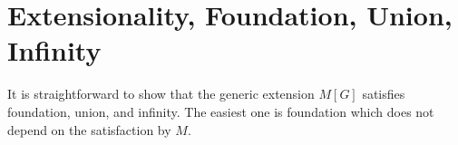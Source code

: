 \section{Extensionality, Foundation, Union, Infinity}
\label{sec:easy-axioms}

It is straightforward to show that the generic extension $M[G]$
satisfies foundation, union, and infinity. The easiest one is
foundation which does not depend on the satisfaction by $M$.




